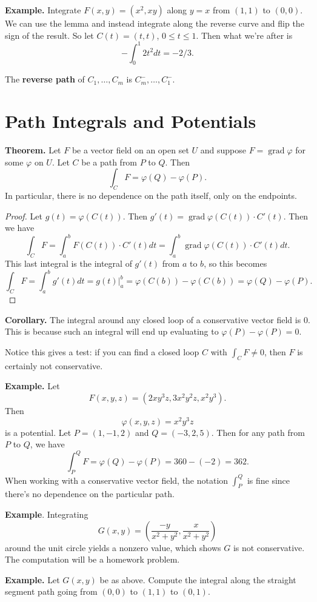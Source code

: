 \documentclass{article}
\DeclareMathOperator{\grd}{grad}
\begin{document}
\textbf{Example.} Integrate $F(x,y) = (x^2,xy)$ along $y=x$
from $(1,1)$ to $(0,0)$. We can use the lemma and instead integrate 
along the reverse curve and flip the sign of the result. So let $C(t) = (t,t)$, 
$0 \leq t \leq 1$. Then what we're after is 
\[-\int_0^1 2t^2 dt = -2/3.\]

The \textbf{reverse path} of $C_1, \ldots, C_m$ is 
$C_m^-, \ldots, C_1^-$.

\section*{Path Integrals and Potentials}

\textbf{Theorem.} Let $F$ be a vector field on an open set $U$ and
suppose $F = \grd \varphi$ for some $\varphi$ on $U$. Let $C$
be a path from $P$ to $Q$. Then 
\[\int_C F = \varphi(Q) - \varphi(P).\]
In particular, there is no dependence on the path itself, only
on the endpoints.
\begin{proof}
    Let $g(t) = \varphi(C(t))$. Then $g'(t) = \grd \varphi(C(t))\cdot C'(t)$.
    Then we have
    \[\int_C F = \int_a^b F(C(t))\cdot C'(t)dt = \int_a^b \grd \varphi(C(t))\cdot C'(t)dt.\]
    This last integral is the integral of $g'(t)$ from $a$ to $b$, so this becomes 
    \[\int_C F = \int_a^b g'(t) dt = g(t) \bigg\vert_a^b = \varphi(C(b)) - \varphi(C(b)) = \varphi(Q) - \varphi(P).\]
\end{proof}

\textbf{Corollary.} The integral around any closed loop of a conservative vector
field is $0$. This is because such an integral will end up evaluating to $\varphi(P) - \varphi(P) = 0$.

Notice this gives a test: if you can find a closed loop $C$ with $\int_C F \neq 0$,
then $F$ is certainly not conservative.


\textbf{Example.} Let \[F(x,y,z) = (2xy^3z, 3x^2y^2z, x^2y^3).\]
Then 
\[\varphi(x,y,z) = x^2y^3z\]
is a potential. Let $P=(1,-1,2)$ and $Q=(-3,2,5)$. Then for any path 
from $P$ to $Q$, we have \[\int_P^Q F = \varphi(Q) - \varphi(P) = 360 - (-2) = 362.\]
When working with a conservative vector field, the notation $\int_P^Q$ is fine 
since there's no dependence on the particular path.

\textbf{Example}. Integrating
\[G(x,y) = \left( \frac{-y}{x^2+y^2}, \frac{x}{x^2+y^2}\right)\]
around the unit circle yields a nonzero value, which shows
$G$ is not conservative. The computation will be a homework problem.

\textbf{Example.} Let $G(x,y)$ be as above. Compute the integral along 
the straight segment path going from $(0,0)$ to $(1,1)$ to $(0,1)$.
\end{document}
